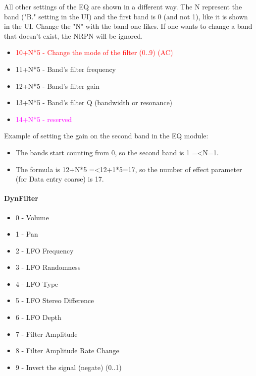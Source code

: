    All other settings of the EQ are shown in a different way.
   The N represent the band ("B." setting in the UI) and the first band is 0
   (and not 1), like it is shown in the UI.
   Change the "N" with the band one likes.
   If one wants to change a band that doesn't exist, the NRPN will be ignored.

   \begin{itemize}
      \item \textcolor{red}{10+N*5 - Change the mode of the filter (0..9) (AC)}
      \item 11+N*5 - Band's filter frequency
      \item 12+N*5 - Band's filter gain
      \item 13+N*5 - Band's filter Q (bandwidth or resonance)
      \item \textcolor{magenta}{14+N*5 - reserved}
   \end{itemize}

   Example of setting the gain on the second band in the EQ module:

   \begin{itemize}
      \item The bands start counting from 0, so the second band is
         1 =\textless N=1.
      \item The formula is 12+N*5 =\textless 12+1*5=17, so the number of effect
         parameter (for Data entry coarse) is 17.
   \end{itemize}

\paragraph{DynFilter}

   \begin{itemize}
      \item 0 - Volume
      \item 1 - Pan
      \item 2 - LFO Frequency
      \item 3 - LFO Randomness
      \item 4 - LFO Type
      \item 5 - LFO Stereo Difference
      \item 6 - LFO Depth
      \item 7 - Filter Amplitude
      \item 8 - Filter Amplitude Rate Change
      \item 9 - Invert the signal (negate) (0..1)
   \end{itemize}

